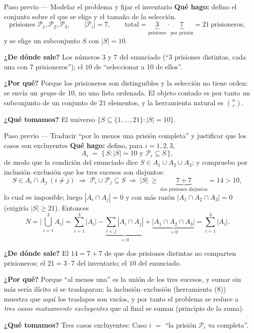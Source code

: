 \documentclass[11pt]{article}
\begin{document}
\begin{paso}{Paso previo --- Modelar el problema y fijar el inventario}
\textbf{Qu\'e hago:} defino el conjunto sobre el que se elige y el tama\~no de la selecci\'on.
\[
\text{prisiones } \mathcal{P}_1,\mathcal{P}_2,\mathcal{P}_3,\qquad |\mathcal{P}_i|=7,\qquad
\text{total}=\underbrace{3}_{\text{prisiones}}\cdot\underbrace{7}_{\text{por prisi\'on}}=21\ \text{prisioneros},
\]
y se elige un subconjunto $S$ con $|S|=10$.

\textbf{¿De d\'onde sale?} Los n\'umeros $3$ y $7$ del enunciado (``3 prisiones distintas, cada una con 7
prisioneros''); el $10$ de ``seleccionar a 10 de ellos''.

\textbf{¿Por qu\'e?} Porque los prisioneros son distinguibles y la selecci\'on no tiene orden: se env\'ia un
\emph{grupo} de $10$, no una lista ordenada. El objeto contado es por tanto un subconjunto de un conjunto de
$21$ elementos, y la herramienta natural es $\binom{n}{r}$.

\textbf{¿Qu\'e tomamos?} El universo $\{S\subseteq\{1,\dots,21\}:|S|=10\}$.
\end{paso}

\begin{paso}{Paso previo --- Traducir ``por lo menos una prisi\'on completa'' y justificar que los casos son excluyentes}
\textbf{Qu\'e hago:} defino, para $i=1,2,3$,
\[
A_i \;=\; \{\, S : |S|=10 \text{ y } \mathcal{P}_i \subseteq S \,\},
\]
de modo que la condici\'on del enunciado dice $S\in A_1\cup A_2\cup A_3$; y compruebo por
inclusi\'on--exclusi\'on que los tres sucesos son disjuntos:
\[
S\in A_i\cap A_j\ (i\ne j) \;\Longrightarrow\; \mathcal{P}_i\cup\mathcal{P}_j\subseteq S
\;\Longrightarrow\; |S|\ \ge\ \underbrace{7+7}_{\text{dos prisiones disjuntas}}=14 > 10 ,
\]
lo cual es imposible; luego $|A_i\cap A_j|=0$ y con m\'as raz\'on $|A_1\cap A_2\cap A_3|=0$ (exigir\'ia
$|S|\ge 21$). Entonces
\[
N=\Big|\bigcup_{i=1}^{3}A_i\Big|=\sum_{i=1}^{3}|A_i|-\underbrace{\sum_{i<j}|A_i\cap A_j|}_{=0}+\underbrace{|A_1\cap A_2\cap A_3|}_{=0}=\sum_{i=1}^{3}|A_i| .
\]

\textbf{¿De d\'onde sale?} El $14=7+7$ de que dos prisiones distintas no comparten prisioneros; el
$21=3\cdot 7$ del inventario; el $10$ del enunciado.

\textbf{¿Por qu\'e?} Porque ``al menos una'' es la uni\'on de los tres sucesos, y sumar sin m\'as ser\'ia
il\'icito si se traslaparan; la inclusi\'on--exclusi\'on (herramienta (8)) muestra que aqu\'i los traslapes
son vac\'ios, y por tanto el problema se reduce a \emph{tres casos mutuamente excluyentes} que al final se
suman (principio de la suma).

\textbf{¿Qu\'e tomamos?} Tres casos excluyentes: Caso $i$ $=$ ``la prisi\'on $\mathcal{P}_i$ va completa''.
\end{paso}
\end{document}
